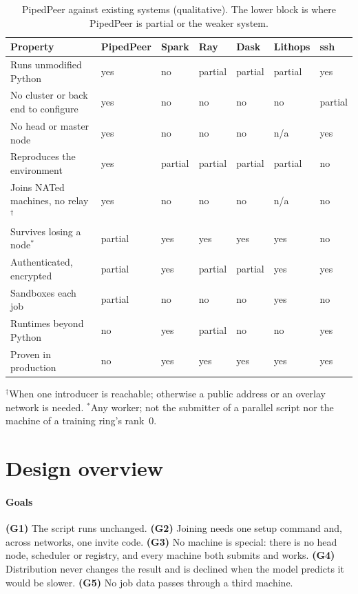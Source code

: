 \documentclass[5p,times,twocolumn]{elsarticle}
\begin{document}
\begin{table}[t]
\centering
\caption{PipedPeer against existing systems (qualitative). The lower block is
where PipedPeer is partial or the weaker system.}
\label{tab:cmp}
\footnotesize
\begin{tabularx}{\textwidth}{X C{1.9cm} C{1.1cm} C{1.1cm} C{1.1cm} C{1.4cm} C{1.0cm}}
\toprule
\textbf{Property} & \textbf{PipedPeer} & \textbf{Spark} & \textbf{Ray} & \textbf{Dask} & \textbf{Lithops} & \textbf{ssh} \\
\midrule
Runs unmodified Python     & yes & no  & partial & partial & partial & yes \\
No cluster or back end to configure & yes & no & no & no & no & partial \\
No head or master node     & yes & no  & no      & no      & n/a     & yes \\
Reproduces the environment & yes & partial & partial & partial & partial & no \\
Joins NATed machines, no relay$^{\dagger}$ & yes & no & no & no & n/a & no \\
\midrule
Survives losing a node$^{*}$ & partial & yes & yes & yes & yes & no \\
Authenticated, encrypted   & partial & yes & partial & partial & yes & yes \\
Sandboxes each job         & partial & no  & no      & no      & yes & no \\
Runtimes beyond Python     & no  & yes & partial & no      & no      & yes \\
Proven in production       & no  & yes & yes     & yes     & yes     & yes \\
\bottomrule
\end{tabularx}
\par\smallskip\raggedright\footnotesize
$^{\dagger}$When one introducer is reachable; otherwise a public address or an
overlay network is needed.
$^{*}$Any worker; not the submitter of a parallel script nor the machine of a
training ring's rank~0.
\end{table}

\section{Design overview}
\label{sec:design}

\paragraph{Goals}
\textbf{(G1)} The script runs unchanged.
\textbf{(G2)} Joining needs one setup command and, across networks, one invite
code.
\textbf{(G3)} No machine is special: there is no head node, scheduler or
registry, and every machine both submits and works.
\textbf{(G4)} Distribution never changes the result and is declined when the
model predicts it would be slower.
\textbf{(G5)} No job data passes through a third machine.
\end{document}
